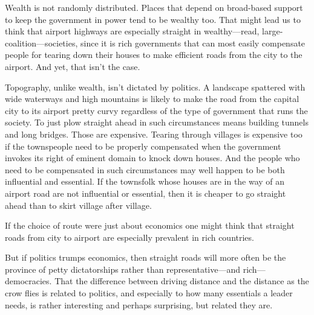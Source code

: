 \documentclass[10pt]{article}
\begin{document}
{\large Wealth is not randomly distributed. Places that depend on broad-based
support to keep the government in power tend to be wealthy too. That might lead
us to think that airport highways are especially straight in wealthy---read,
large-coalition---societies, since it is rich governments that can most easily
compensate people for tearing down their houses to make efficient roads from the
city to the airport. And yet, that isn't the case.}

{\large Topography, unlike wealth, isn't dictated by politics. A landscape
spattered with wide waterways and high mountains is likely to make the road from
the capital city to its airport pretty curvy regardless of the type of government
that runs the society. To just plow straight ahead in such circumstances means
building tunnels and long bridges. Those are expensive. Tearing through villages
is expensive too if the townspeople need to be properly compensated when the
government invokes its right of eminent domain to knock down houses. And the
people who need to be compensated in such circumstances may well happen to be
both influential and essential. If the townsfolk whose houses are in the way of
an airport road are not influential or essential, then it is cheaper to go
straight ahead than to skirt village after village.}

{\large If the choice of route were just about economics one might think that
straight roads from city to airport are especially prevalent in rich countries.}

{\large But if politics trumps economics, then straight roads will more often be
the province of petty dictatorships rather than representative---and rich---
democracies. That the difference between driving distance and the distance as the
crow flies is related to politics, and especially to how many essentials a leader
needs, is rather interesting and perhaps surprising, but related they are.}
\end{document}
